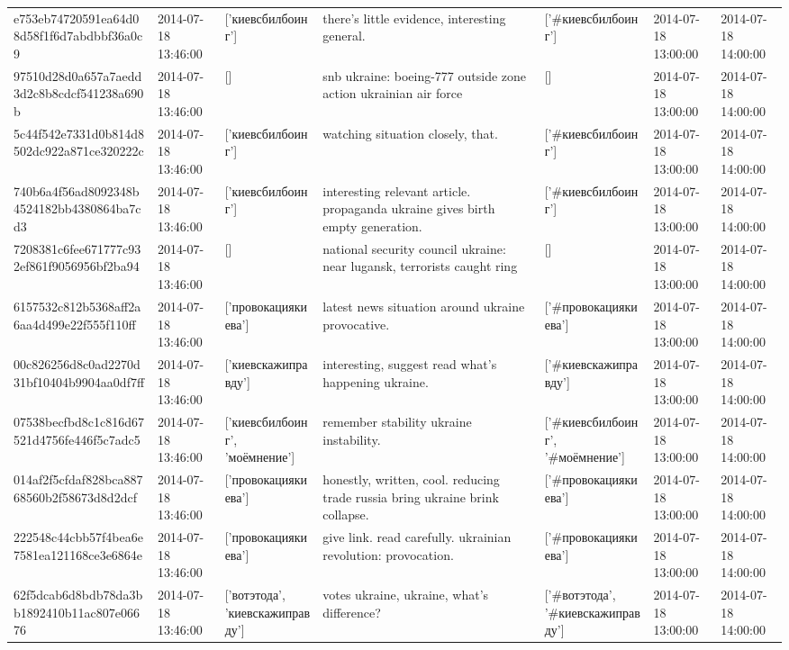 \begin{tabular}{lllllll}
e753eb74720591ea64d08d58f1f6d7abdbbf36a0c9 & 2014-07-18 13:46:00 & ['киевсбилбоинг'] & there's little evidence, interesting general. & ['#киевсбилбоинг'] & 2014-07-18 13:00:00 & 2014-07-18 14:00:00 \\
97510d28d0a657a7aedd3d2c8b8cdcf541238a690b & 2014-07-18 13:46:00 & [] & snb ukraine: boeing-777 outside zone action ukrainian air force & [] & 2014-07-18 13:00:00 & 2014-07-18 14:00:00 \\
5c44f542e7331d0b814d8502dc922a871ce320222c & 2014-07-18 13:46:00 & ['киевсбилбоинг'] & watching situation closely, that. & ['#киевсбилбоинг'] & 2014-07-18 13:00:00 & 2014-07-18 14:00:00 \\
740b6a4f56ad8092348b4524182bb4380864ba7cd3 & 2014-07-18 13:46:00 & ['киевсбилбоинг'] & interesting relevant article. propaganda ukraine gives birth empty generation. & ['#киевсбилбоинг'] & 2014-07-18 13:00:00 & 2014-07-18 14:00:00 \\
7208381c6fee671777c932ef861f9056956bf2ba94 & 2014-07-18 13:46:00 & [] & national security council ukraine: near lugansk, terrorists caught ring & [] & 2014-07-18 13:00:00 & 2014-07-18 14:00:00 \\
6157532c812b5368aff2a6aa4d499e22f555f110ff & 2014-07-18 13:46:00 & ['провокациякиева'] & latest news situation around ukraine provocative. & ['#провокациякиева'] & 2014-07-18 13:00:00 & 2014-07-18 14:00:00 \\
00c826256d8c0ad2270d31bf10404b9904aa0df7ff & 2014-07-18 13:46:00 & ['киевскажиправду'] & interesting, suggest read what's happening ukraine. & ['#киевскажиправду'] & 2014-07-18 13:00:00 & 2014-07-18 14:00:00 \\
07538becfbd8c1c816d67521d4756fe446f5c7adc5 & 2014-07-18 13:46:00 & ['киевсбилбоинг', 'моёмнение'] & remember stability ukraine instability. & ['#киевсбилбоинг', '#моёмнение'] & 2014-07-18 13:00:00 & 2014-07-18 14:00:00 \\
014af2f5cfdaf828bca88768560b2f58673d8d2dcf & 2014-07-18 13:46:00 & ['провокациякиева'] & honestly, written, cool. reducing trade russia bring ukraine brink collapse. & ['#провокациякиева'] & 2014-07-18 13:00:00 & 2014-07-18 14:00:00 \\
222548c44cbb57f4bea6e7581ea121168ce3e6864e & 2014-07-18 13:46:00 & ['провокациякиева'] & give link. read carefully. ukrainian revolution: provocation. & ['#провокациякиева'] & 2014-07-18 13:00:00 & 2014-07-18 14:00:00 \\
62f5dcab6d8bdb78da3bb1892410b11ac807e06676 & 2014-07-18 13:46:00 & ['вотэтода', 'киевскажиправду'] & votes ukraine, ukraine, what's difference? & ['#вотэтода', '#киевскажиправду'] & 2014-07-18 13:00:00 & 2014-07-18 14:00:00 \\

\end{tabular}
